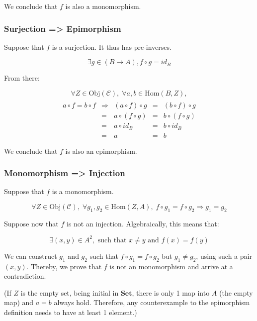 \documentclass[12pt, letterpaper, twoside]{report}
\begin{document}
We conclude that $f$ is also a monomorphism.


\subsubsection*{Surjection => Epimorphism}

Suppose that $f$ is a surjection. It thus has pre-inverses.

$$\exists g \in (B \to A), f \circ g = id_B$$

From there:

$$
\forall Z \in \text{Obj}(\mathcal{C}), \;
\forall a, b \in \text{Hom}(B, Z),
$$
$$
\begin{array}{ccccc} \\
a \circ f = b \circ f & \Rightarrow & (a \circ  f) \circ g  &=& (b \circ  f) \circ g  \\
                      & =           &  a \circ (f  \circ g) &=&  b \circ (f  \circ g) \\
                      & =           &  a \circ  id_B        &=&  b \circ  id_B        \\
                      & =           &  a                    &=&  b
\end{array}
$$

We conclude that $f$ is also an epimorphism.


\subsubsection*{Monomorphism => Injection}

Suppose that $f$ is a monomorphism.

$$
\forall Z \in \text{Obj}(\mathcal{C}), \;
\forall g_1, g_2 \in \text{Hom}(Z, A), \;
f \circ g_1 = f \circ g_2 \Rightarrow g_1 = g_2
$$

Suppose now that $f$ is not an injection. Algebraically, this means that:

$$\exists (x, y) \in A^2, \text{ such that } x \neq y \text{ and } f(x) = f(y)$$

We can construct $g_1$ and $g_2$ such that $f \circ g_1 = f \circ g_2$ but $g_1 \neq g_2$, using such a pair $(x, y)$. Thereby, we prove that $f$ is not an monomorphism and arrive at a contradiction.

(If $Z$ is the empty set, being initial in $\mathbf{Set}$, there is only 1 map into $A$ (the empty map) and $a = b$ always hold. Therefore, any counterexample to the epimorphism definition needs to have at least 1 element.)
\end{document}
